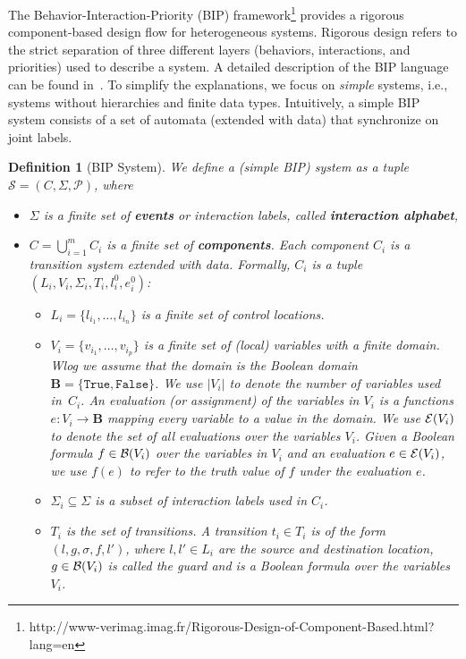 \documentclass[10pt, a4paper, onecolumn, conference, compsocconf]{IEEEtran}
\newcommand{\true}{\texttt{True}}
\newcommand{\false}{\texttt{False}}
\newcommand\bool{\mathbf{B}}
\newcommand\boolform{{\cal B}}
\newcommand\eval{{\cal E}}
\newcommand{\initloc}[1]{l^0_{#1}}
\newcommand{\initeval}[1]{e^0_{#1}}
\newtheorem{defi}{Definition}
\begin{document}
The Behavior-Interaction-Priority (BIP) framework\footnote{http://www-verimag.imag.fr/Rigorous-Design-of-Component-Based.html?lang=en} provides a rigorous component-based design flow for heterogeneous systems.  Rigorous design refers to the strict separation of three different layers (behaviors, interactions, and priorities) used to describe a system.
A detailed description of the BIP language can be found in~\cite{basu2006modeling}.
To simplify the explanations, we focus on \emph{simple} systems, i.e., systems without hierarchies and finite data types.
Intuitively, a simple BIP system consists of a set of automata (extended with data) that synchronize on joint labels.


\begin{defi}[BIP System]
We define a (simple BIP) system as a tuple $\mathcal{S} = (C , \Sigma, \mathcal{P})$, where
\begin{itemize}
 \item $\Sigma$ is a finite set of \textbf{events} or interaction labels, called \textbf{interaction alphabet},
 \item $C = \bigcup_{i=1}^m C_i$ is a finite set of \textbf{components}. Each component $C_i$ is
 a transition system extended with data. Formally, $C_i$ is a tuple
$(L_i, V_i, \Sigma_i, T_i, \initloc{i}, \initeval{i})$:
 \begin{itemize}
    \item $L_i=\{l_{i_1},\ldots,l_{i_n}\}$ is a finite set of \emph{control locations}.
    \item $V_i = \{v_{i_1},\ldots,v_{i_p}\}$ is a finite set of \emph{(local) variables} with a finite domain.
    Wlog we assume that the domain is the Boolean domain $\bool = \{\true, \false\}$.
We use $|V_i|$ to denote the number of variables used in~$C_i$.  An \emph{evaluation (or assignment)} of the variables in $V_i$ is a functions $e: V_i\to\bool$ mapping every variable to a value in the domain.  We use $\eval(V_i)$ to denote the set of all evaluations over the variables $V_i$.  Given a Boolean formula $f\in \boolform(V_i) $ over the variables in $V_i$ and an evaluation $e\in \eval(V_i)$, we use $f(e)$ to refer to the truth value of $f$ under the evaluation $e$.
\item $\Sigma_i \subseteq \Sigma$ is a subset of interaction labels used in $C_i$.
    \item $T_i$ is the set of \emph{transitions}. A transition $t_i\in T_i$ is of the form $(l,g,\sigma,f,l')$, where $l, l'\in L_i$ are the \emph{source and destination location}, $g \in \boolform(V_i)$ is called the \emph{guard} and is a Boolean formula over the variables $V_i$.

\end{itemize}
\end{itemize}
\end{defi}
\end{document}
